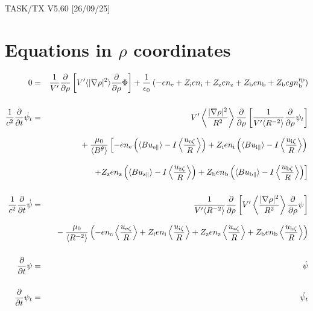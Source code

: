 \documentclass[11pt]{article}
\def\r#1{{\rm#1}}
\def\ave#1{\left\langle#1\right\rangle}
\def\aves#1{\langle#1\rangle}
\def\para{\parallel}
\def\ddrho{\frac{\partial}{\partial\rho}}
\def\ddt{\frac{\partial}{\partial t}}
\def\gradrho2{\aves{|\nabla\rho|^2}}
\def\psid{\dot{\psi}}
\def\psit{\psi_t}
\def\psitd{\dot{\psit}}
\def\nee{n_\r{e}}
\def\ni{n_\r{i}}
\def\nz{n_\r{z}}
\def\nb{n_\r{b}}
\def\Zi{Z_\r{i}}
\def\Zz{Z_\r{z}}
\def\Zb{Z_\r{b}}
\def\uzt#1{u_{\r{#1}\zeta}}
\def\upara#1{u_{\r{#1}\para}}
\def\nbrp{n_\r{b}^\r{rp}}
\begin{document}
\begin{center}
TASK/TX V5.60 [26/09/25]
\end{center}

\section{Equations in $\rho$ coordinates}
\vspace{-5mm}

%
\begin{eqnarray}
  0 &=&
%
    \frac{1}{V'} \ddrho \left[ V' \gradrho2 \ddrho{\Phi} \right]
%
  + \frac{1}{\epsilon_0}
%
    \left(-e \nee + \Zi e \ni + \Zz e \nz + \Zb e \nb + \Zb e g \nbrp \right)
\\[5mm]
  \frac{1}{c^2} \ddt \psitd &=&
%
    V' \ave{\frac{|\nabla\rho|^2}{R^2}} \ddrho \left[ \frac{1}{V'\aves{R^{-2}}}
				         \ddrho \psit \right] \nonumber\\[3mm]&&{}
%
  + \frac{\mu_0}{\aves{B^\theta}}
%
    \left[-     e \nee \left( \aves{B\upara{e}} - I\ave{\frac{\uzt{e}}{R}} \right)
          + \Zi e \ni  \left( \aves{B\upara{i}} - I\ave{\frac{\uzt{i}}{R}} \right)
    \right.\nonumber\\[3mm]&&{}
    \left.+ \Zz e \nz  \left( \aves{B\upara{z}} - I\ave{\frac{\uzt{z}}{R}} \right)
          + \Zb e \nb  \left( \aves{B\upara{b}} - I\ave{\frac{\uzt{b}}{R}} \right) \right]
\\[5mm]
  \frac{1}{c^2} \ddt \psid &=&
%
  \frac{1}{V'\aves{R^{-2}}} \ddrho \left[ V'
				    \ave{\frac{|\nabla\rho|^2}{R^2}}
				    \ddrho \psi \right] \nonumber\\[3mm]&&{}
%
  - \frac{\mu_0}{\aves{R^{-2}}} \left(-e \nee \ave{\frac{\uzt{e}}{R}}
			         + \Zi e \ni  \ave{\frac{\uzt{i}}{R}}
			         + \Zz e \nz  \ave{\frac{\uzt{z}}{R}}
			         + \Zb e \nb  \ave{\frac{\uzt{b}}{R}} \right)
%
\\[5mm]
  \ddt \psi &=&
%
  \psid
\\[5mm]
  \ddt \psit &=&
%
  \psitd
\end{eqnarray}
%

\end{document}
